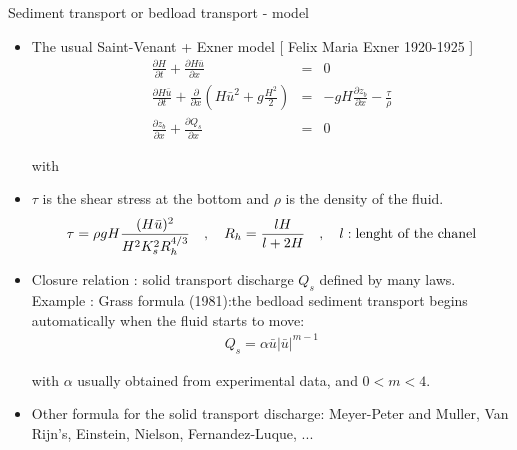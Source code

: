    
\begin{frame}{Sediment transport or bedload transport - model  }

\begin{itemize}
\item The usual Saint-Venant + Exner model [ Felix Maria Exner  1920-1925 ]
\begin{eqnarray*}
\frac{\partial H}{\partial t}+\frac{\partial H\bar{u}}{\partial x} &=& 0 \\
\frac{\partial H\bar{u}}{\partial t}
+\frac{\partial}{\partial x}\left(  H\bar{u}^2 + g\frac{H^2}{2}\right)&=&-gH\frac{\partial z_b}{\partial x} - \frac{\tau}{\rho} \\
\frac{\partial z_b}{\partial x}+\frac{\partial Q_s}{\partial x}&=&0
\end{eqnarray*}

with
\item $\tau$ is the shear stress at the bottom and $\rho$ is the density of the fluid.
 \begin{eqnarray*}
\tau = \rho g H \frac{(H\bar{u})^2 }{H^2K_s^2 R_h^{4/3}} \quad,\quad R_h=\frac{lH}{l+2H}\quad,\quad l:\hbox{lenght of the chanel}
\end{eqnarray*}

\item Closure relation : solid transport discharge $Q_s$ defined by many laws. \\
Example : Grass formula (1981):the bedload sediment transport
begins automatically when the fluid
starts to move:
 \begin{eqnarray}
Q_s = \alpha \bar{u} | \bar{u} |^{m-1}
\end{eqnarray}

with $\alpha$  usually obtained from experimental data, and $0<m<4$.

\item Other formula for the solid transport discharge: Meyer-Peter and Muller, Van Rijn's, Einstein, Nielson, Fernandez-Luque, ... 



\end{itemize}



\end{frame}



